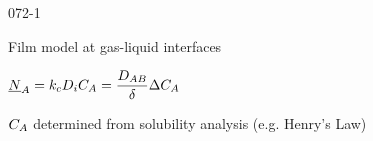 \begin{mitframe}{072-1}
\begin{listone}
	\item Film model at gas-liquid interfaces
    	\begin{listtwo}
        	\item $\uline{\nummoles}_{\helmholtz}=\thermcond_{c}\pdiff\conc_{\helmholtz}=\dfrac{\elecdisplace_{\helmholtz\exergy}}{\blthick}\iipf\conc_{\helmholtz}$
        \end{listtwo}
\item $\conc_{\helmholtz}$ determined from solubility analysis (e.g. Henry's Law)
\end{listone}
\end{mitframe}